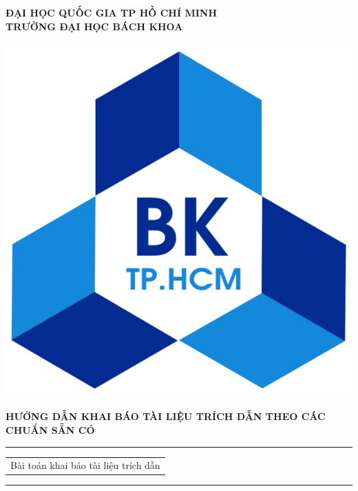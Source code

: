 \documentclass{hcmutarticle}
\begin{document}
\thispagestyle{empty}
\begin{center}
\LARGE\bfseries ĐẠI HỌC QUỐC GIA TP HỒ CHÍ MINH \\
TRƯỜNG ĐẠI HỌC BÁCH KHOA
\end{center}

\begin{center}
\includegraphics[scale=0.2]{hcmut.pdf}\\[1cm]
\end{center}

\vspace{1cm}

\begin{center}
\Large \bfseries HƯỚNG DẪN KHAI BÁO TÀI LIỆU TRÍCH DẪN THEO CÁC  CHUẨN SẴN CÓ \\[0.5cm]
\end{center}
\rule{\textwidth}{1pt}
\vspace{2pt}
\begin{center}
\Huge
\begin{tabular}{@{}l}
Bài toán khai báo tài liệu trích dẫn\\[6pt]
\end{tabular}
\end{center}
\rule{\textwidth}{1pt}\\[1cm]

\vspace{3cm}
\end{document}
